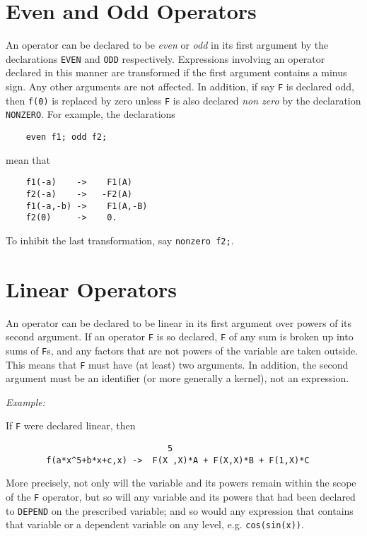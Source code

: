 \section{Even and Odd Operators}
An operator can be declared to be {\em even\/} or {\em odd\/} in its first
argument by the declarations {\tt EVEN} and
{\tt ODD} respectively.  Expressions involving an operator
declared in this manner are transformed if the first argument contains a
minus sign.  Any other arguments are not affected.  In addition, if say
{\tt F} is declared odd, then {\tt f(0)} is replaced by zero unless
{\tt F} is also declared {\em non zero\/} by the declaration
{\tt NONZERO}.  For example, the declarations
\begin{verbatim}
	even f1; odd f2;
\end{verbatim}
mean that
\begin{verbatim}
	f1(-a)    ->    F1(A)
	f2(-a)    ->   -F2(A)
	f1(-a,-b) ->    F1(A,-B)
	f2(0)     ->    0.
\end{verbatim}
To inhibit the last transformation, say {\tt nonzero f2;}.

\section{Linear Operators}
An operator can be declared to be linear in its first argument over powers
of its second argument.  If an operator {\tt F} is so declared, {\tt F} of
any sum is broken up into sums of {\tt F}s, and any factors that are not
powers of the variable are taken outside.  This means that {\tt F} must
have (at least) two arguments.  In addition, the second argument must be
an identifier (or more generally a kernel), not an expression.

{\it Example:}

If {\tt F} were declared linear, then
\begin{verbatim}
                                5
        f(a*x^5+b*x+c,x) ->  F(X ,X)*A + F(X,X)*B + F(1,X)*C
\end{verbatim}
More precisely, not only will the variable and its powers remain within the
scope of the {\tt F} operator, but so will any variable and its powers that
had been declared to {\tt DEPEND} on the prescribed variable; and so would
any expression that contains that variable or a dependent variable on any
level, e.g. {\tt cos(sin(x))}.

